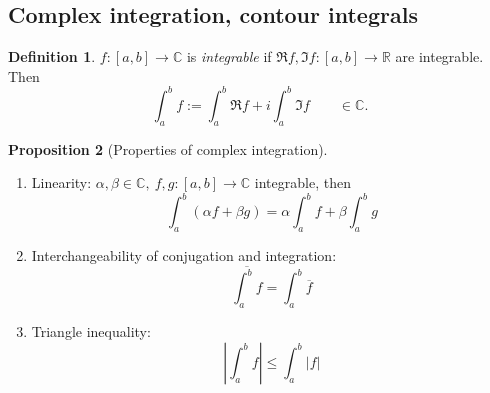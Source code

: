 \documentclass[a4paper]{article}
\theoremstyle{definition}
\newtheorem{defn}{Definition}[subsection]
\newtheorem{prop}[defn]{Proposition}
\begin{document}
\begin{center}
\end{center}
\subsection{Complex integration, contour integrals}
\begin{defn}
$f:[a,b] \rightarrow \mathbb C$ is \textit{integrable} if $\Re f,\Im f:[a,b]\rightarrow \mathbb R$ are integrable. Then
\[
\int_a^b f := \int_a^b \Re f + i \int_a^b \Im f \qquad \in \mathbb C .
\]
\end{defn}
\begin{prop}[Properties of complex integration]
\begin{enumerate}
    \item Linearity: $\alpha,\beta \in \mathbb C,\ f,g:[a,b]\rightarrow \mathbb C$ integrable, then
    \[
    \int_a^b (\alpha f+\beta g) = \alpha \int_a^b f + \beta \int_a^b g
    \]
    \item Interchangeability of conjugation and integration:
    \[
    \overline{\int_a^b f} = \int_a^b \overline{f}
    \]
    \item Triangle inequality:
    \[
    \left|\int_a^b f \right| \leq \int_a^b |f|
    \]
\end{enumerate}
\end{prop}
\end{document}
